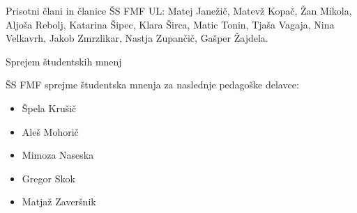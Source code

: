 \documentclass{seja}
\begin{document}
Prisotni člani in članice ŠS FMF UL:
Matej Janežič, Matevž Kopač, Žan Mikola, Aljoša Rebolj, Katarina Šipec, Klara Širca, Matic Tonin, Tjaša Vagaja, Nina Velkavrh, Jakob Zmrzlikar, Nastja Zupančič, Gašper Žajdela.

\begin{red}
    \item
    Sprejem študentskih mnenj
\end{red}

\begin{ad}
    \item
    \begin{sklep*}
       ŠS FMF sprejme študentska mnenja za naslednje pedagoške delavce:
       \begin{itemize}
            \item Špela Krušič
            \item Aleš Mohorič
            \item Mimoza Naseska
            \item Gregor Skok
            \item Matjaž Zaveršnik
       \end{itemize}
    \end{sklep*}
   
\end{ad}
\makeatletter \global\let\@enddocumenthook\@empty \makeatother
{}
\end{document}
